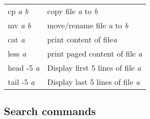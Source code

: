 \begin{longtable}[]{@{}ll@{}}
\begin{minipage}[t]{0.26\columnwidth}\raggedright\strut
cp \emph{a} \emph{b}\strut
\end{minipage} & \begin{minipage}[t]{0.50\columnwidth}\raggedright\strut
copy file \emph{a} to \emph{b}\strut
\end{minipage}\tabularnewline
\begin{minipage}[t]{0.26\columnwidth}\raggedright\strut
mv \emph{a} \emph{b}\strut
\end{minipage} & \begin{minipage}[t]{0.50\columnwidth}\raggedright\strut
move/rename file \emph{a} to \emph{b}\strut
\end{minipage}\tabularnewline
\begin{minipage}[t]{0.26\columnwidth}\raggedright\strut
cat \emph{a}\strut
\end{minipage} & \begin{minipage}[t]{0.50\columnwidth}\raggedright\strut
print content of file\emph{a}\strut
\end{minipage}\tabularnewline
\begin{minipage}[t]{0.26\columnwidth}\raggedright\strut
less \emph{a}\strut
\end{minipage} & \begin{minipage}[t]{0.50\columnwidth}\raggedright\strut
print paged content of file \emph{a}\strut
\end{minipage}\tabularnewline
\begin{minipage}[t]{0.26\columnwidth}\raggedright\strut
head -5 \emph{a}\strut
\end{minipage} & \begin{minipage}[t]{0.50\columnwidth}\raggedright\strut
Display first 5 lines of file \emph{a}\strut
\end{minipage}\tabularnewline
\begin{minipage}[t]{0.26\columnwidth}\raggedright\strut
tail -5 \emph{a}\strut
\end{minipage} & \begin{minipage}[t]{0.50\columnwidth}\raggedright\strut
Display last 5 lines of file \emph{a}\strut
\end{minipage}\tabularnewline
\bottomrule
\end{longtable}

\subsection{Search commands}\label{search-commands}


